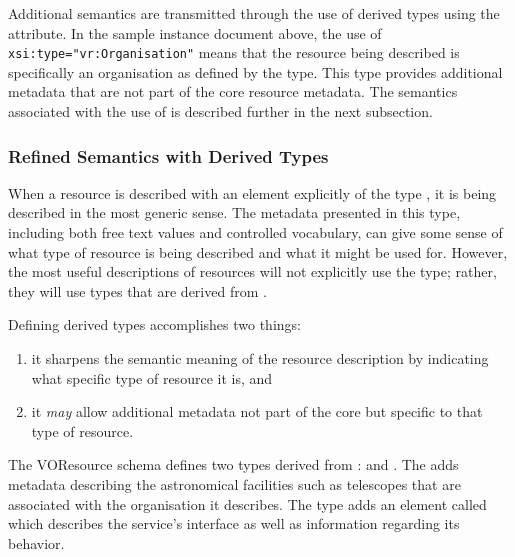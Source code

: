 \documentclass[11pt,a4paper]{ivoa}
\begin{document}
Additional semantics are transmitted through the use of derived types
using the  attribute.  In the sample instance document
above, the use of \verb|xsi:type="vr:Organisation"| means that the
resource being described is specifically an organisation as defined by
the  type.  This type provides additional
metadata that are not part of the core resource metadata.  The semantics
associated with the use of  is described further in the
next subsection.



\subsubsection{Refined Semantics with Derived Types}
\label{sect:derivedtypes}

When a resource is described with an element explicitly of the type
, it is being described in the most generic
sense.  The metadata presented in this type, including both free text
values and controlled vocabulary, can give some sense of what
type of resource is being described and what it might be used for.
However, the most useful descriptions of resources will not explicitly
use the  type; rather, they will use types
that are derived from .  



Defining derived  types accomplishes two
things:
\begin{enumerate}
  \item it sharpens the semantic meaning of the resource description by
       indicating what specific type of resource it is, and
  \item it \emph{may} allow additional metadata not part of the core
       but specific to that type of resource.
\end{enumerate}



The VOResource schema defines two types derived from
:   and
.   The  adds
metadata describing the astronomical facilities such as telescopes
that are associated with the organisation it describes.  The
 type adds an element called
 which describes the service's interface as
well as information regarding its behavior.  
\end{document}
